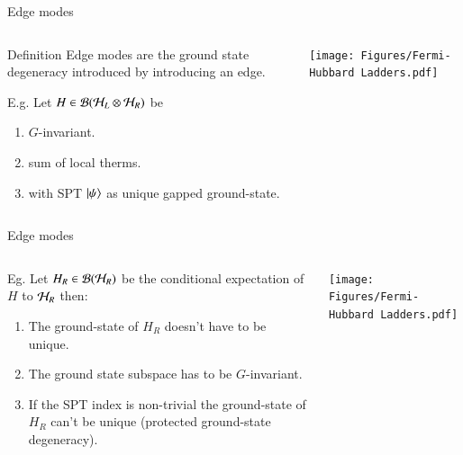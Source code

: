 \documentclass{beamer}
\begin{document}
\begin{frame}{Edge modes}
	\begin{columns}
		\begin{column}{0.6\textwidth}
			\begin{block}{Definition}
				Edge modes are the ground state degeneracy introduced by introducing an edge.
			\end{block}
			\pause
			E.g. Let $H\in\mathcal{B}(\mathcal{H}_L\otimes\mathcal{H}_R)$ be
			\begin{enumerate}
				\item $G$-invariant.
				\item sum of local therms.
				\item with SPT $\ket{\psi}$ as unique gapped ground-state.
			\end{enumerate}
		\end{column}
		\begin{column}{0.4\textwidth}  %
			\begin{center}
				\texttt{[image: Figures/Fermi-Hubbard Ladders.pdf]}
			\end{center}
		\end{column}
	\end{columns}
\end{frame}

\begin{frame}{Edge modes}
	\begin{columns}
		\begin{column}{0.6\textwidth}
			Eg. Let $H_R\in\mathcal{B}(\mathcal{H}_R)$ be the conditional expectation of $H$ to $\mathcal{H}_R$ then:
			\pause
			\begin{enumerate}
				\item The ground-state of $H_R$ doesn't have to be unique.
				\item The ground state subspace has to be $G$-invariant.
				\item If the SPT index is non-trivial the ground-state of $H_R$ can't be unique (protected ground-state degeneracy).
			\end{enumerate}
		\end{column}
		\begin{column}{0.4\textwidth}  %
			\begin{center}
				\texttt{[image: Figures/Fermi-Hubbard Ladders.pdf]}
			\end{center}
		\end{column}
	\end{columns}
\end{frame}
\end{document}
